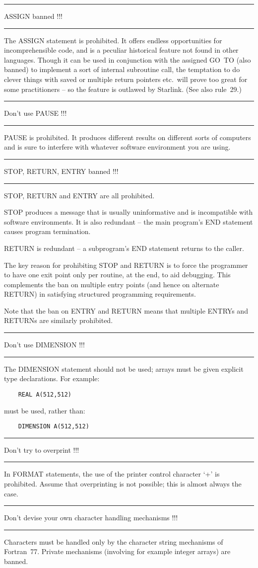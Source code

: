 \documentclass[twoside,11pt]{article}
\newcounter{sruleno}
\newcommand{\srule}[1]{
    \addtocounter{sruleno}{1}
    \goodbreak
    \rule[0.5ex]{\textwidth}{0.3mm}
    {\Large #1 \hfill {\thesruleno}}
    \rule[0.5ex]{\textwidth}{0.1mm}
}
\newcommand{\srule}[1]{
       \addtocounter{sruleno}{1}
       \begin{rawhtml} <HR> \end{rawhtml}
       {\Large \thesruleno}~~~~{\Large #1}
       \begin{rawhtml} <HR> \end{rawhtml}
       \end{tabular}
  }
\renewcommand{\_}{{\tt\char'137}}
\begin{document}
\srule{ASSIGN banned !!!}
The ASSIGN statement is prohibited.  It offers endless opportunities
for incomprehensible code, and is a peculiar historical feature
not found in other languages.  Though it can be used in conjunction
with the assigned GO~TO (also banned) to implement a sort of
internal subroutine call, the temptation to do clever things
with saved or multiple return pointers etc.\ will prove too great
for some practitioners -- so the feature is outlawed by Starlink.  (See
also rule~29.)

\srule{Don't use PAUSE !!!}
PAUSE is prohibited.  It produces different results on different
sorts of computers and is sure to interfere with whatever
software environment you are using.

\srule{STOP, RETURN, ENTRY banned !!!}
STOP, RETURN and ENTRY are all prohibited.

STOP produces a message that is usually uninformative and is incompatible with
software environments.
It is also redundant -- the main program's END statement
causes program termination.

RETURN is redundant -- a subprogram's END statement returns to the caller.

The key reason for prohibiting STOP and RETURN is to force the programmer to
have one exit point only per routine, at the end, to aid debugging.
This complements the ban on multiple entry points (and hence on alternate
RETURN) in satisfying structured programming requirements.

Note that the ban on ENTRY and RETURN means that multiple ENTRYs
and RETURNs are similarly prohibited.

\srule{Don't use DIMENSION !!!}
The DIMENSION statement should not be used; arrays must be given explicit type
declarations.
For example:
\begin{verbatim}
    REAL A(512,512)
\end{verbatim}
must be used, rather than:
\begin{verbatim}
    DIMENSION A(512,512)
\end{verbatim}

\srule{Don't try to overprint !!!}
In FORMAT statements,
the use of the printer control character `+' is prohibited.
Assume that overprinting is not possible;
this is almost always the case.

\srule{Don't devise your own character handling mechanisms !!!}
Characters must be handled only by the character string mechanisms of
Fortran~77.  Private mechanisms (involving for example integer arrays) are
banned.
\end{document}
